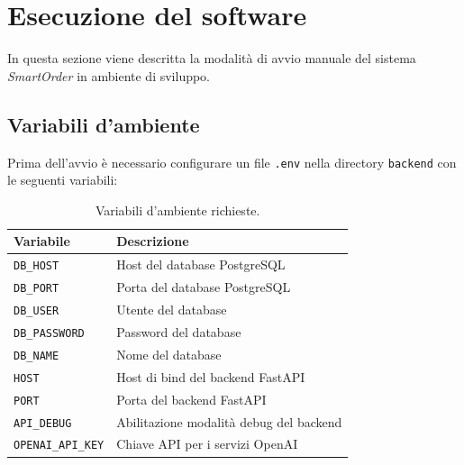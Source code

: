 \documentclass[a4paper, 11pt, oneside]{scrartcl}
\begin{document}
\newpage
\section{Esecuzione del software}

In questa sezione viene descritta la modalit\`a di avvio manuale del sistema \textit{SmartOrder} in ambiente di sviluppo.

\subsection{Variabili d'ambiente}

Prima dell'avvio \`e necessario configurare un file \texttt{.env} nella directory \texttt{backend} con le seguenti variabili:

\begin{table}[H]
    \centering
    \renewcommand{\arraystretch}{1.2}
    \begin{tabularx}{\textwidth}{@{}p{4.5cm}X@{}}
        \toprule
        \textbf{Variabile}        & \textbf{Descrizione}                      \\
        \midrule
        \texttt{DB\_HOST}         & Host del database PostgreSQL              \\
        \texttt{DB\_PORT}         & Porta del database PostgreSQL             \\
        \texttt{DB\_USER}         & Utente del database                       \\
        \texttt{DB\_PASSWORD}     & Password del database                     \\
        \texttt{DB\_NAME}         & Nome del database                         \\
        \texttt{HOST}             & Host di bind del backend FastAPI          \\
        \texttt{PORT}             & Porta del backend FastAPI                 \\
        \texttt{API\_DEBUG}       & Abilitazione modalit\`a debug del backend \\
        \texttt{OPENAI\_API\_KEY} & Chiave API per i servizi OpenAI           \\
        \bottomrule
    \end{tabularx}
    \caption{Variabili d'ambiente richieste.}
\end{table}
\end{document}
